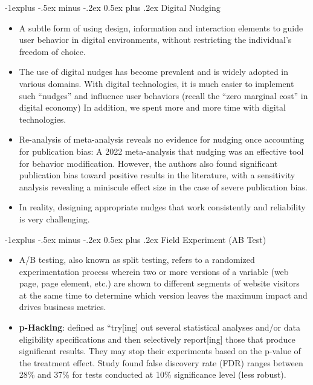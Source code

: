 \documentclass[12pt, landscape]{article}
\makeatletter
\renewcommand{\subsection}{\@startsection{subsection}{2}{0mm}%
                                {-1explus -.5ex minus -.2ex}%
                                {0.5ex plus .2ex}%
                                {\normalfont\normalsize\bfseries}}
\makeatother
\begin{document}
\begin{multicols*}{3}
\subsection{Digital Nudging}
\begin{itemize}
\item A subtle form of using design, information and interaction elements to guide user behavior in digital environments, without restricting the individual's freedom of choice.
\item The use of digital nudges has become prevalent and is widely adopted in various domains. With digital technologies, it is much easier to implement such “nudges” and influence user behaviors (recall the “zero marginal cost” in digital economy) In addition, we spent more and more time with digital technologies.
\item Re-analysis of meta-analysis reveals no evidence for nudging once accounting for publication bias: A 2022 meta-analysis that nudging was an effective tool for behavior modification. However, the authors also found significant publication bias toward positive results in the literature, with a sensitivity analysis revealing a miniscule effect size in the case of severe publication bias.
\item In reality, designing appropriate nudges that work consistently and reliability is very challenging.
\end{itemize}
\subsection{Field Experiment (AB Test)}
\begin{itemize}
\item A/B testing, also known as split testing, refers to a randomized experimentation process wherein two or more versions of a variable (web page, page element, etc.) are shown to different segments of website visitors at the same time to determine which version leaves the maximum impact and drives business metrics.
\item \textbf{p-Hacking}: defined as “try[ing] out several statistical analyses and/or data eligibility specifications and then selectively report[ing] those that produce significant results. They may stop their experiments based on the p-value of the treatment effect. Study found false discovery rate (FDR) ranges between 28\% and 37\% for tests conducted at 10\% significance level (less robust).
\end{itemize}


\end{multicols*}
\end{document}
